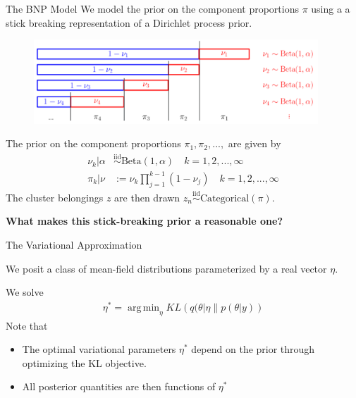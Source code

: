 \documentclass[10pt]{beamer}\usepackage[]{graphicx}\usepackage[]{color}
\DeclareMathOperator*{\argmin}{arg\,min}
\begin{document}
\begin{frame}{The BNP Model}
We model the prior on the component proportions $\pi$ using a
a stick breaking representation of a Dirichlet process prior.
\vspace{-0.2in}
\begin{figure}[!h]
\centering
\includegraphics[width = 0.95\textwidth]{./figures/DP_stick_breaking.png}
\end{figure}
\vspace{-0.1in}
The prior on the component proportions $\pi_1, \pi_2, ..., $ are given by
%
\begin{align*}
\nu_k \vert \alpha &\overset{\text{iid}}{\sim} \text{Beta}\left(1, \alpha \right)\quad k = 1, 2, ..., \infty \\
\pi_k | \nu &:= \nu_k \prod_{j=1}^{k-1} (1 - \nu_j) \quad k = 1, 2, ..., \infty
\end{align*}
%
The cluster belongings $z$ are then drawn 
$z_n\overset{\text{iid}}{\sim} \mathrm{Categorical}(\pi)$. 

\pause 

\begin{mdframed}[style=MyFrame]
\begin{center}
{\bf What makes this stick-breaking prior a reasonable one?}
\end{center}
\end{mdframed}

\end{frame}

\begin{frame}{The Variational Approximation}

We posit a class of mean-field distributions parameterized by a real vector $\eta$. 

We solve
\begin{align*}
  \eta^* = \argmin_{\eta} KL\left(
      q(\theta \vert \eta \big\| p(\theta | y)
      \right)
\end{align*}
%
Note that 

\begin{itemize}
\item The optimal variational parameters $\eta^*$ depend on the prior through optimizing the KL objective. 

\item All posterior quantities are then functions of $\eta^*$

\end{itemize}

\end{frame}
\end{document}
